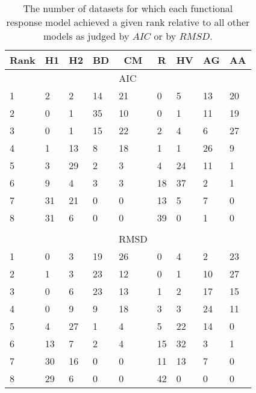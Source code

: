 \begin{table}[!tbp]
\caption{The number of datasets for which each functional response model achieved a given rank 
relative to all other models as judged by $AIC$ or by $RMSD$.\label{table:AIC_and_RMSD_rankings}} 
\begin{center}
\begin{tabular}{lllllllll}
\hline\hline
\multicolumn{1}{l}{Rank}&\multicolumn{1}{c}{H1}&\multicolumn{1}{c}{H2}&\multicolumn{1}{c}{BD}&\multicolumn{1}{c}{CM}&\multicolumn{1}{c}{R}&\multicolumn{1}{c}{HV}&\multicolumn{1}{c}{AG}&\multicolumn{1}{c}{AA}\tabularnewline
\hline
&&&&AIC&&&&\tabularnewline
1&2&2&14&21&0&5&13&20\tabularnewline
2&0&1&35&10&0&1&11&19\tabularnewline
3&0&1&15&22&2&4&6&27\tabularnewline
4&1&13&8&18&1&1&26&9\tabularnewline
5&3&29&2&3&4&24&11&1\tabularnewline
6&9&4&3&3&18&37&2&1\tabularnewline
7&31&21&0&0&13&5&7&0\tabularnewline
8&31&6&0&0&39&0&1&0\tabularnewline
&&&&&&&&\tabularnewline
&&&&RMSD&&&&\tabularnewline
1&0&3&19&26&0&4&2&23\tabularnewline
2&1&3&23&12&0&1&10&27\tabularnewline
3&0&6&23&13&1&2&17&15\tabularnewline
4&0&9&9&18&3&3&24&11\tabularnewline
5&4&27&1&4&5&22&14&0\tabularnewline
6&13&7&2&4&15&32&3&1\tabularnewline
7&30&16&0&0&11&13&7&0\tabularnewline
8&29&6&0&0&42&0&0&0\tabularnewline
\hline
\end{tabular}\end{center}
\end{table}
